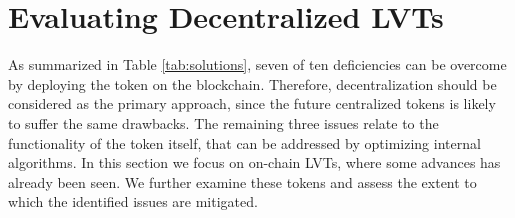 \section{Evaluating Decentralized LVTs}\label{sec:evaluation}
As summarized in Table \ref{tab:solutions}, seven of ten deficiencies can be overcome by deploying the token on the blockchain. Therefore, decentralization should be considered as the primary approach, since the future centralized tokens is likely to suffer the same drawbacks. The remaining three issues relate to the functionality of the token itself, that can be addressed by optimizing internal algorithms. In this section we focus on on-chain LVTs, where some advances has already been seen. We further examine these tokens and assess the extent to which the identified issues are mitigated.


